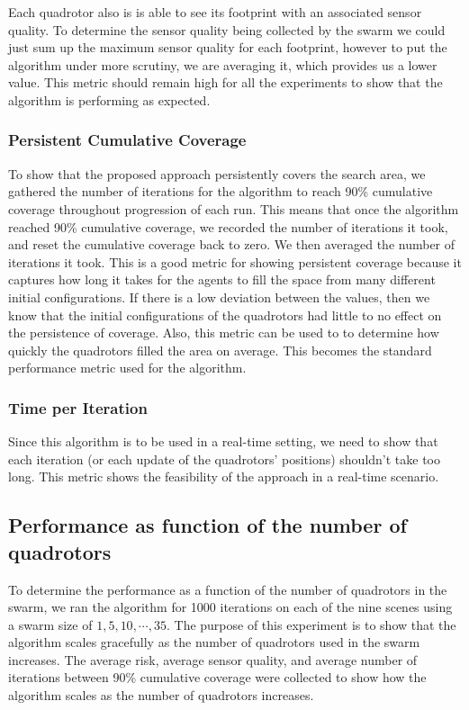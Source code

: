 \documentclass{article}
\begin{document}
Each quadrotor also is is able to see its footprint with an associated sensor
quality. To determine the sensor quality being collected by the swarm we could
just sum up the maximum sensor quality for each footprint, however to put the
algorithm under more scrutiny, we are averaging it, which provides us a lower
value. This metric should remain high for all the experiments to show that the
algorithm is performing as expected.


\subsubsection{Persistent Cumulative Coverage}

To show that the proposed approach persistently covers the search area, we
gathered the number of iterations for the algorithm to reach 90\% cumulative
coverage throughout progression of each run. This means that once the algorithm
reached 90\% cumulative coverage, we recorded the number of iterations it took,
and reset the cumulative coverage back to zero. We then averaged the number of
iterations it took. This is a good metric for showing persistent coverage
because it captures how long it takes for the agents to fill the space from
many different initial configurations. If there is a low deviation between the
values, then we know that the initial configurations of the quadrotors had
little to no effect on the persistence of coverage. Also, this metric can be
used to to determine how quickly the quadrotors filled the area on average.
This becomes the standard performance metric used for the algorithm.

\subsubsection{Time per Iteration}

Since this algorithm is to be used in a real-time setting, we need to show that
each iteration (or each update of the quadrotors' positions) shouldn't take too
long. This metric shows the feasibility of the approach in a real-time
scenario.

\subsection{Performance as function of the number of quadrotors}

To determine the performance as a function of the number of quadrotors in the
swarm, we ran the algorithm for 1000 iterations on each of the nine scenes
using a swarm size of $1, 5, 10, \cdots, 35$. The purpose of this experiment is
to show that the algorithm scales gracefully as the number of quadrotors used
in the swarm increases. The average risk, average sensor quality, and average
number of iterations between 90\% cumulative coverage were collected to show
how the algorithm scales as the number of quadrotors increases.
\end{document}
